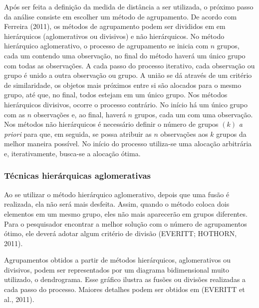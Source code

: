 \documentclass[12pt, a4paper,brazil,oneside]{article}
\begin{document}
	Após ser feita a definição da medida de distância a ser utilizada, o próximo passo da análise consiste em escolher um método de agrupamento. De acordo com Ferreira (2011), os métodos de agrupamento podem ser divididos em  em hierárquicos (aglomerativos ou divisivos) e não hierárquicos. No método hierárquico aglomerativo, o processo de agrupamento se inicia com $n$ grupos, cada um contendo uma observação, no final do método haverá um único grupo com todas as observações. A cada passo do processo iterativo, cada observação ou grupo é unido a outra observação ou grupo. A união se dá através de um critério de similaridade, os objetos mais próximos entre si são alocados para o mesmo grupo, até que, no final, todos estejam em um único grupo. Nos métodos hierárquicos divisivos, ocorre o processo contrário. No início há um único grupo com as $n$ observações e, ao final, haverá $n$ grupos, cada um com uma observação. Nos métodos não hierárquicos é necessário definir o número de grupos $(k)$ \textit{a priori} para que, em seguida, se possa atribuir as $n$ observações aos $k$ grupos da melhor maneira possível. No início do processo utiliza-se uma alocação arbitrária e, iterativamente, busca-se a alocação ótima.
	
	\subsubsection{Técnicas hierárquicas aglomerativas}
	
	Ao se utilizar o método hierárquico aglomerativo, depois que uma fusão é realizada, ela não será mais desfeita. Assim, quando o método coloca dois elementos em um mesmo grupo, eles não mais aparecerão em grupos diferentes. Para o pesquisador encontrar a melhor solução com o número de agrupamentos ótimo, ele deverá adotar algum critério de divisão (EVERITT; HOTHORN, 2011).
	
	Agrupamentos obtidos a partir de métodos hierárquicos, aglomerativos ou divisivos, podem ser representados por um diagrama bidimensional muito utilizado, o dendrograma. Esse gráfico ilustra as fusões ou divisões realizadas a cada passo do processo. Maiores detalhes podem ser obtidos em (EVERITT et al., 2011).
	
\end{document}
